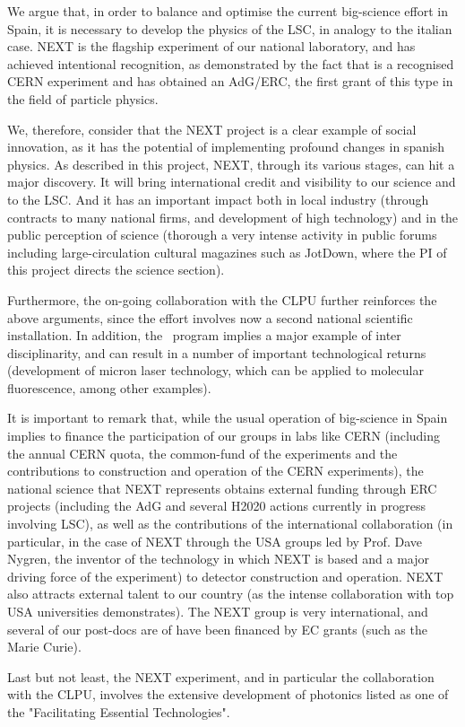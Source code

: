 We argue that, in order to balance and optimise the current big-science effort in Spain, it is necessary to develop the physics of the LSC, in analogy to the italian case. NEXT is the flagship experiment of our national laboratory, and has achieved intentional recognition, as demonstrated by the fact that is a recognised CERN experiment and has obtained an AdG/ERC, the first grant of this type in the field of particle physics. 

We, therefore, consider that the NEXT project is a clear example of social innovation, as it has the potential of implementing profound changes in spanish physics. As described in this project, NEXT, through its various stages, can hit a major discovery. It will bring international credit and visibility to our science and to the LSC. And it has an important impact both in local industry (through contracts to many national firms, and development of high technology) and in the public perception of science (thorough a very intense activity in public forums including large-circulation cultural magazines such as JotDown, where the PI of this project directs the science section). 

Furthermore, the on-going collaboration with the CLPU further reinforces the above arguments, since the effort involves now a second national scientific installation. In addition, the \BATA\ program implies a major example of inter disciplinarity, and can result in a number of important technological returns (development of micron laser technology, which can be applied to molecular fluorescence, among other examples).

It is important to remark that, while the usual operation of big-science in Spain implies to finance the participation of our groups in labs like CERN (including the annual CERN quota, the common-fund of the experiments and the contributions to construction and operation of the CERN experiments), the national science that NEXT represents obtains external funding through ERC projects (including the AdG and several H2020 actions currently in progress involving LSC), as well as the contributions of the international collaboration (in particular, in the case of NEXT through the USA groups led by Prof. Dave Nygren, the inventor of the technology in which NEXT is based and a major driving force of the experiment) to detector construction and operation. NEXT also attracts external talent to our country (as the intense collaboration with top USA universities demonstrates). The NEXT group is very international, and several of our post-docs are of have been financed by EC grants (such as the Marie Curie). 

Last but not least, the NEXT experiment, and in particular the collaboration with the CLPU, involves the extensive development of photonics listed as one of the  "Facilitating Essential Technologies".